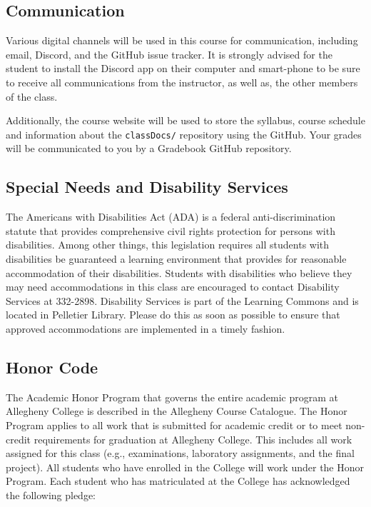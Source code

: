 \documentclass[11pt]{article} %
\begin{document}
\subsection*{\textbf{Communication}}
Various digital channels will be used in this course for communication, including email,
Discord, and the GitHub issue tracker. It is strongly advised for the student to install the Discord app on their computer and smart-phone to be sure to receive all communications from the instructor, as well as, the other members of the class.

Additionally, the course website will be used to store the syllabus, course schedule and information about the {\tt classDocs/} repository using the GitHub.  Your grades will be communicated to you by a Gradebook GitHub repository. 




\vspace*{-.10in}
\subsection*{\textbf{Special Needs and Disability Services}}

The Americans with Disabilities Act (ADA) is a federal anti-discrimination statute that provides comprehensive civil rights protection for persons with disabilities.  Among other things, this legislation requires all students with disabilities be guaranteed a learning environment that provides for reasonable accommodation of their disabilities. Students with disabilities who believe they may need accommodations in this class are encouraged to contact Disability Services at 332-2898. Disability Services is part of the Learning Commons and is located in Pelletier Library. Please do this as soon as possible to ensure that approved accommodations are implemented in a timely fashion.

\vspace{-.10in}
\subsection*{\textbf{Honor Code}}

The Academic Honor Program that governs the entire academic program at Allegheny College is described in the Allegheny Course Catalogue.  The Honor Program applies to all work that is submitted for academic credit or to meet non-credit requirements for graduation at Allegheny College.  This includes all work assigned for this class (e.g., examinations, laboratory assignments, and the final project).  All students who have enrolled in the College will work under the Honor Program.  Each student who has matriculated at the College has acknowledged the following pledge:
\end{document}
